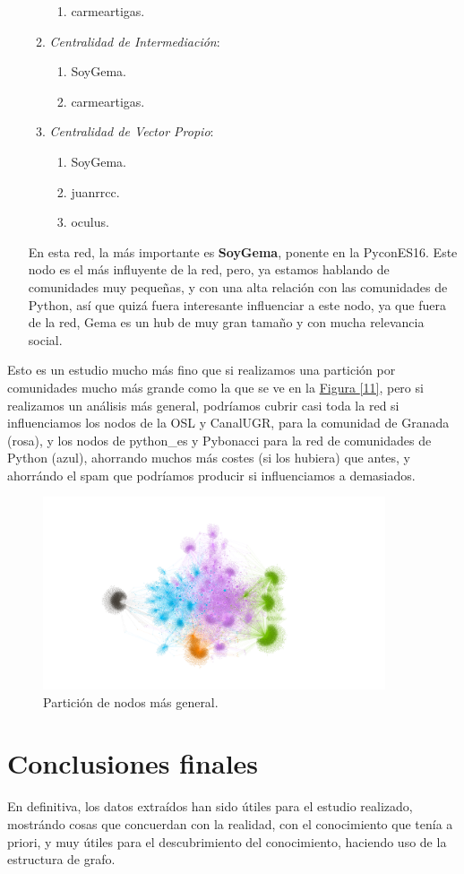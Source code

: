 \documentclass[paper=a4, fontsize=11pt]{article} %
\numberwithin{equation}{section} %
\numberwithin{figure}{section} %
\numberwithin{table}{section} %
\begin{document}
\begin{enumerate}[$\bullet$]
\begin{enumerate}[---]
\begin{enumerate}
      \item carmeartigas.
    \end{enumerate}
    \item \textit{Centralidad de Intermediación}:
    \begin{enumerate}
      \item SoyGema.
      \item carmeartigas.
    \end{enumerate}
    \item \textit{Centralidad de Vector Propio}:
    \begin{enumerate}
      \item SoyGema.
      \item juanrrcc.
      \item oculus.
    \end{enumerate}
  \end{enumerate}
  En esta red, la más importante es \textbf{SoyGema}, ponente en la PyconES16. Este nodo es el más influyente de la red, pero, ya estamos hablando de comunidades muy pequeñas, y con una alta relación con las comunidades de Python, así que quizá fuera interesante influenciar a este nodo, ya que fuera de la red, Gema es un hub de muy gran tamaño y con mucha relevancia social.
\end{enumerate}

Esto es un estudio mucho más fino que si realizamos una partición por comunidades mucho más grande como la que se ve en la \hyperref[im11]{Figura \ref*{11}}, pero si realizamos un análisis más general, podríamos cubrir casi toda la red si influenciamos los nodos de la OSL y CanalUGR, para la comunidad de Granada (rosa), y los nodos de python\_es y Pybonacci para la red de comunidades de Python (azul), ahorrando muchos más costes (si los hubiera) que antes, y ahorrándo el spam que podríamos producir si influenciamos a demasiados.

\begin{figure}[H]
  \centering
  \includegraphics[width=0.9\textwidth]{comBig}
  \caption{Partición de nodos más general.}
  \label{im11}
\end{figure}

\section{Conclusiones finales}

En definitiva, los datos extraídos han sido útiles para el estudio realizado, mostrándo cosas que concuerdan con la realidad, con el conocimiento que tenía a priori, y muy útiles para el descubrimiento del conocimiento, haciendo uso de la estructura de grafo.
\end{document}
